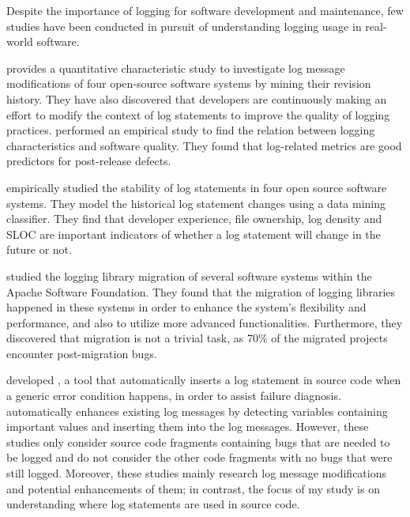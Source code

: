 Despite the importance of logging for software development and maintenance, few studies have been conducted in pursuit of understanding logging usage in real-world software.

\citet{yuan2012characterizing} provides a quantitative characteristic study to investigate log message modifications of four open-source software systems by mining their revision history.  They have also discovered that developers are continuously making an effort to modify the context of log statements to improve the quality of logging practices. \citet{shang2015studying} performed an empirical study to find the relation between logging characteristics and software quality. They found that log-related metrics are good predictors for post-release defects.

\citet{kabinna2016examining} empirically studied the stability of log statements in four open source software systems. They model the historical log statement changes using a data mining classifier. They find that developer experience, file ownership, log density and SLOC are important indicators of whether a log statement will change in the future or not.

\citet{kabinna2016logging} studied the logging library migration of several software systems within the Apache Software Foundation\@. They found that the migration of logging libraries happened in these systems in order to enhance the system's flexibility and performance, and also to utilize more advanced functionalities. Furthermore, they discovered that migration is not a trivial task, as 70\% of the migrated projects encounter post-migration bugs.

\citet{yuan2012conservative} developed , a tool that automatically inserts a log statement in source code when a generic error condition happens, in order to assist failure diagnosis.  \cite{yuan2012improving} automatically enhances existing log messages by detecting variables containing important values and inserting them into the log messages. However, these studies only consider source code fragments containing bugs that are needed to be logged and do not consider the other code fragments with no bugs that were still logged. Moreover, these studies mainly research log message modifications and potential enhancements of them; in contrast, the focus of my study is on understanding where log statements are used in source code.

